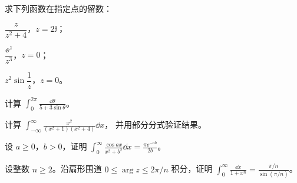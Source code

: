 \documentclass{mojing-notes}
\begin{document}
\begin{exercises}
  \item 求下列函数在指定点的留数：
        \begin{inlinelist}
          \item $\dfrac{z}{z^2+4}$，$z=2\ii$；
          \item $\dfrac{\ee^z}{z^3}$，$z=0$；
          \item $z^2\sin\dfrac1z$，$z=0$。
        \end{inlinelist}
  \item 计算 $\displaystyle\int_0^{2\pi}\frac{\dd\theta}{5+3\sin\theta}$。
  \item 计算 $\displaystyle\int_{-\infty}^{\infty}\frac{x^2}{(x^2+1)(x^2+4)}\dd x$，
        并用部分分式验证结果。
  \item 设 $a\ge0$，$b>0$，证明 $\displaystyle\int_0^{\infty}\frac{\cos ax}{x^2+b^2}\dd x
        =\frac{\pi\ee^{-ab}}{2b}$。
  \item\hard 设整数 $n\ge2$。沿扇形围道 $0\le\arg z\le 2\pi/n$ 积分，证明
        $\displaystyle\int_0^{\infty}\frac{\dd x}{1+x^n}=\frac{\pi/n}{\sin(\pi/n)}$。
\end{exercises}
\end{document}

